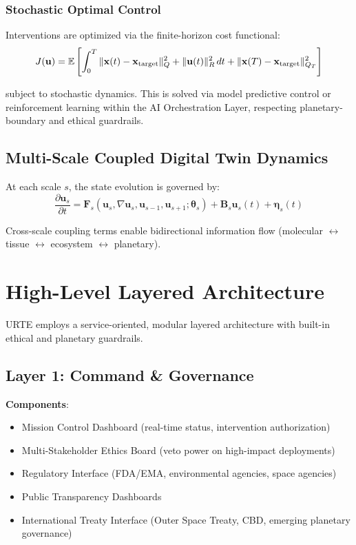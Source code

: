 \documentclass[11pt,a4paper]{report}
\begin{document}
\subsection{Stochastic Optimal Control}

Interventions are optimized via the finite-horizon cost functional:
\[
J(\mathbf{u}) = \mathbb{E}\left[ \int_0^T \|\mathbf{x}(t) - \mathbf{x}_{\rm target}\|_Q^2 + \|\mathbf{u}(t)\|_R^2 \, dt + \|\mathbf{x}(T) - \mathbf{x}_{\rm target}\|_{Q_T}^2 \right]
\]

subject to stochastic dynamics. This is solved via model predictive control or reinforcement learning within the AI Orchestration Layer, respecting planetary-boundary and ethical guardrails.

\section{Multi-Scale Coupled Digital Twin Dynamics}

At each scale $s$, the state evolution is governed by:
\[
\frac{\partial \mathbf{u}_s}{\partial t} = \mathbf{F}_s(\mathbf{u}_s, \nabla \mathbf{u}_s, \mathbf{u}_{s-1}, \mathbf{u}_{s+1}; \boldsymbol{\theta}_s) + \mathbf{B}_s \mathbf{u}_s(t) + \boldsymbol{\eta}_s(t)
\]

Cross-scale coupling terms enable bidirectional information flow (molecular $\leftrightarrow$ tissue $\leftrightarrow$ ecosystem $\leftrightarrow$ planetary).

\chapter{High-Level Layered Architecture}

URTE employs a service-oriented, modular layered architecture with built-in ethical and planetary guardrails.

\section{Layer 1: Command \& Governance}

\textbf{Components}:
\begin{itemize}
    \item Mission Control Dashboard (real-time status, intervention authorization)
    \item Multi-Stakeholder Ethics Board (veto power on high-impact deployments)
    \item Regulatory Interface (FDA/EMA, environmental agencies, space agencies)
    \item Public Transparency Dashboards
    \item International Treaty Interface (Outer Space Treaty, CBD, emerging planetary governance)
\end{itemize}
\end{document}
